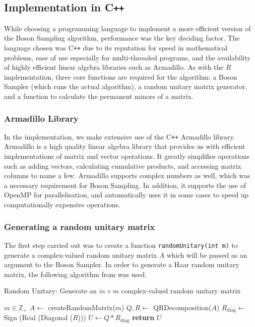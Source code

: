 \documentclass[11pt]{article}
\theoremstyle{theorem}
\theoremstyle{theorem}
\theoremstyle{remark}
\theoremstyle{note}
\theoremstyle{plain}
\theoremstyle{definition}
\begin{document}
\subsection{Implementation in C\texttt{++}}
While choosing a programming language to implement a more efficient version of the Boson Sampling algorithm, performance was the key deciding factor. The language chosen was C\texttt{++} due to its reputation for speed in mathematical problems, ease of use especially for multi-threaded programs, and the availability of highly efficient linear algebra libraries such as Armadillo. As with the $R$ implementation, three core functions are required for the algorithm: a Boson Sampler (which runs the actual algorithm), a random unitary matrix generator, and a function to calculate the permanent minors of a matrix.

\subsubsection*{Armadillo Library}
In the implementation, we make extensive use of the C\texttt{++} Armadillo library\cite{armadillo}. Armadillo is a high quality linear algebra library that provides us with efficient implementations of matrix and vector operations. It greatly simplifies operations such as adding vectors, calculating cumulative products, and accessing matrix columns to name a few. Armadillo supports complex numbers as well, which was a necessary requirement for Boson Sampling. In addition, it supports the use of OpenMP for parallelisation, and automatically uses it in some cases to speed up computationally expensive operations.

\subsubsection{Generating a random unitary matrix}
The first step carried out was to create a function \texttt{randomUnitary(int m)} to generate a complex-valued random unitary matrix $A$ which will be passed as an argument to the Boson Sampler. In order to generate a Haar random unitary matrix, the following algorithm from \cite{ozols2009} was used.
\begin{algorithm}
\caption{Random Unitary: Generate an $m \times m$ complex-valued random unitary matrix}
\begin{algorithmic}[1]
\Require $m \in \mathbb{Z}_+$
\State $A \leftarrow$ createRandomMatrix($m$)
\State $Q, R \leftarrow$ QRDecomposition($A$)
\State $R_{\text{diag}} \leftarrow$ Sign (Real (Diagonal ($R$)))
\State $U \leftarrow Q * R_{\text{diag}}$
\State \textbf{return} $U$
\end{algorithmic}
\end{algorithm}
\end{document}
